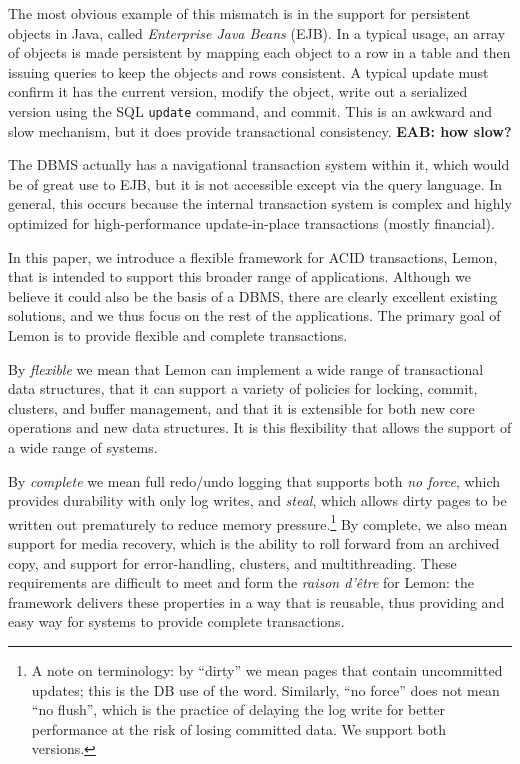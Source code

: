 \documentclass[letterpaper,twocolumn,english]{article}
\newcommand{\yad}{Lemon\xspace}
\newcommand{\eab}[1]{{\bf EAB: #1}}
\begin{document}
The most obvious example of this mismatch is in the support for
persistent objects in Java, called {\em Enterprise Java Beans}
(EJB). In a typical usage, an array of objects is made persistent by
mapping each object to a row in a table and then issuing queries to
keep the objects and rows consistent.  A typical update must confirm
it has the current version, modify the object, write out a serialized
version using the SQL {\tt update} command, and commit.  This is an
awkward and slow mechanism, but it does provide transactional
consistency. \eab{how slow?}

The DBMS actually has a navigational transaction system within it,
which would be of great use to EJB, but it is not accessible except
via the query language.  In general, this occurs because the internal
transaction system is complex and highly optimized for
high-performance update-in-place transactions (mostly financial).

In this paper, we introduce a flexible framework for ACID
transactions, \yad, that is intended to support this broader range of
applications.  Although we believe it could also be the basis of a
DBMS, there are clearly excellent existing solutions, and we thus
focus on the rest of the applications.  The primary goal of \yad is to
provide flexible and complete transactions.

By {\em flexible} we mean that \yad can implement a wide range of
transactional data structures, that it can support a variety of
policies for locking, commit, clusters, and buffer management, and
that it is extensible for both new core operations and new data
structures.  It is this flexibility that allows the support of a wide
range of systems.

By {\em complete} we mean full redo/undo logging that supports both
{\em no force}, which provides durability with only log writes, and
{\em steal}, which allows dirty pages to be written out prematurely to
reduce memory pressure.\footnote{A note on terminology: by ``dirty''
we mean pages that contain uncommitted updates; this is the DB use of
the word. Similarly, ``no force'' does not mean ``no flush'', which is
the practice of delaying the log write for better performance at the
risk of losing committed data. We support both versions.} By complete,
we also mean support for media recovery, which is the ability to roll
forward from an archived copy, and support for error-handling,
clusters, and multithreading.  These requirements are difficult to
meet and form the {\em raison d'\^{e}tre} for \yad: the framework delivers
these properties in a way that is reusable, thus providing and easy
way for systems to provide complete transactions.
\end{document}
